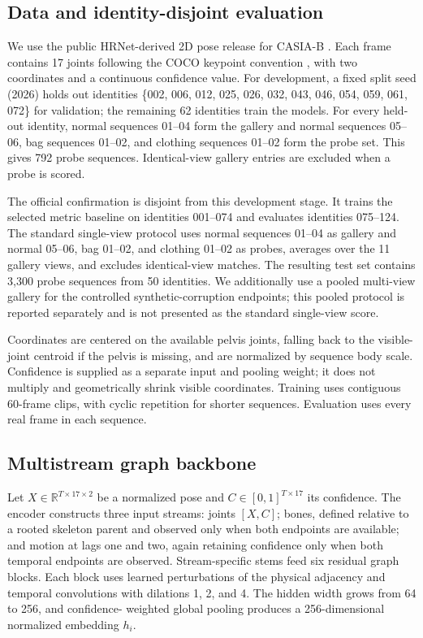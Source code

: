 \documentclass[runningheads]{llncs}
\newcommand{\R}{\mathbb{R}}
\begin{document}
\subsection{Data and identity-disjoint evaluation}

We use the public HRNet-derived \cite{sun2019hrnet} 2D pose release for CASIA-B
\cite{yu2006casia}. Each frame contains 17 joints following the COCO keypoint
convention \cite{lin2014coco}, with two coordinates and a continuous confidence
value.
For development, a fixed split seed (2026) holds out identities
\{002, 006, 012, 025, 026, 032, 043, 046, 054, 059, 061, 072\} for validation;
the remaining 62 identities train the models. For every held-out identity,
normal sequences 01--04 form the gallery and normal sequences 05--06, bag
sequences 01--02, and clothing sequences 01--02 form the probe set. This gives
792 probe sequences. Identical-view gallery entries are excluded when a probe
is scored.

The official confirmation is disjoint from this development stage. It trains
the selected metric baseline on identities 001--074 and evaluates identities
075--124. The standard single-view protocol uses normal sequences 01--04 as
gallery and normal 05--06, bag 01--02, and clothing 01--02 as probes, averages
over the 11 gallery views, and excludes identical-view matches. The resulting
test set contains 3,300 probe sequences from 50 identities. We additionally use
a pooled multi-view gallery for the controlled synthetic-corruption endpoints;
this pooled protocol is reported separately and is not presented as the
standard single-view score.

Coordinates are centered on the available pelvis joints, falling back to the
visible-joint centroid if the pelvis is missing, and are normalized by sequence
body scale. Confidence is supplied as a separate input and pooling weight; it
does not multiply and geometrically shrink visible coordinates. Training uses
contiguous 60-frame clips, with cyclic repetition for shorter sequences.
Evaluation uses every real frame in each sequence.

\subsection{Multistream graph backbone}

Let $X\in\R^{T\times17\times2}$ be a normalized pose and
$C\in[0,1]^{T\times17}$ its confidence. The encoder constructs three input
streams: joints $[X,C]$; bones, defined relative to a rooted skeleton parent and
observed only when both endpoints are available; and motion at lags one and two,
again retaining confidence only when both temporal endpoints are observed.
Stream-specific stems feed six residual graph blocks. Each block uses learned
perturbations of the physical adjacency and temporal convolutions with
dilations 1, 2, and 4. The hidden width grows from 64 to 256, and confidence-
weighted global pooling produces a 256-dimensional normalized embedding
$h_i$.
\end{document}
